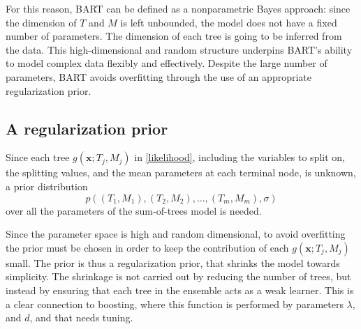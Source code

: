 \documentclass[a4paper,11pt]{article}
\begin{document}
For this reason, BART can be defined as a nonparametric Bayes approach: since the dimension of $T$ and $M$ is left unbounded, the model does not have a fixed number of parameters. The dimension of each tree is going to be inferred from the data. This high-dimensional and random structure underpins BART's ability to model complex data flexibly and effectively. Despite the large number of parameters, BART avoids overfitting through the use of an appropriate regularization prior.

\subsection{A regularization prior}

Since each tree \( g(\mathbf{x}; T_j, M_j) \) in \eqref{likelihood}, including the variables to split on, the splitting values, and the mean parameters at each terminal node, is unknown, a prior distribution 
\[
p((T_1, M_1), (T_2, M_2), \ldots, (T_m, M_m), \sigma)
\]
over all the parameters of the sum-of-trees model is needed. 

Since the parameter space is high and random dimensional, to avoid overfitting the prior must be chosen in order to keep the contribution of each \(g(\mathbf{x}; T_j, M_j)\) small. The prior is thus a regularization prior, that shrinks the model towards simplicity. The shrinkage is not carried out by reducing the number of trees, but instead by ensuring that each tree in the ensemble acts as a weak learner. This is a clear connection to boosting, where this function is performed by parameters $\lambda$, and $d$, and that needs tuning.  
\end{document}
